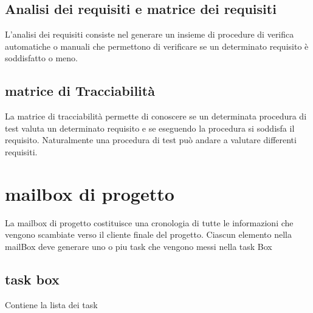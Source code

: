\documentclass[10pt,a4paper]{book}
\begin{document}
\subsection{Analisi dei requisiti e matrice dei requisiti}
L'analisi dei requisiti  consiste nel generare un insieme di procedure di verifica automatiche o manuali che permettono di verificare se un determinato requisito è soddisfatto o meno. 

\subsection{matrice di Tracciabilità}
La matrice di tracciabilità permette di conoscere se un determinata procedura di test valuta un determinato requisito e se eseguendo la procedura si soddisfa il requisito. Naturalmente una procedura di test può andare a valutare differenti requisiti.

\section{mailbox di progetto}
La mailbox di progetto costituisce una cronologia di tutte le informazioni che vengono scambiate verso il cliente finale del progetto. Ciascun elemento nella mailBox deve generare uno o piu task che vengono messi nella task Box

\subsection{task box}
Contiene la lista dei task
\end{document}
